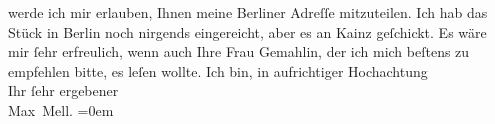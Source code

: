 \begin{ledgroupsized}[t]{13cm}
                    werde ich mir erlauben, Ihnen meine Berliner
                    Adreſſe mitzuteilen. Ich hab das Stück in Berlin noch nirgends
                    eingereicht, aber es an Kainz geſchickt.\pend
           \pstart
           Es wäre mir ſehr erfreulich, wenn auch Ihre Frau Gemahlin, der ich mich beſtens zu empfehlen bitte, es
                    leſen wollte.\pend
           \pstart
           Ich bin, in aufrichtiger Hochachtung{\\[\baselineskip]}Ihr ſehr ergebener{\\[\baselineskip]}\spacefill\mbox{Max Mell.}\pend
           \leftskip=0em{}
         
         \endnumbering{}\end{ledgroupsized}  \newcommand{\dateiname}{L01631}\newcommand{\titel}{Max Mell an Arthur Schnitzler, 11. 10. 1906}\newcommand{\editorInnen}{Martin Anton Müller und Gerd-Hermann Susen}
      